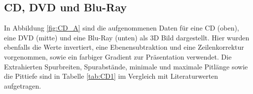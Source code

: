 
\subsection{CD, DVD und Blu-Ray}

In Abbildung \ref{fig:CD_A} sind die aufgenommenen Daten für eine CD (oben), eine DVD (mitte) und eine Blu-Ray (unten)
als 3D Bild dargestellt. Hier wurden ebenfalls die Werte invertiert, eine Ebenensubtraktion und eine Zeilenkorrektur vorgenommen, 
sowie ein farbiger Gradient zur Präsentation verwendet. Die Extrahierten Spurbreiten, Spurabstände, minimale und maximale Pitlänge sowie die Pittiefe 
sind in Tabelle \ref{tab:CD1} im Vergleich mit Literaturwerten aufgetragen.


